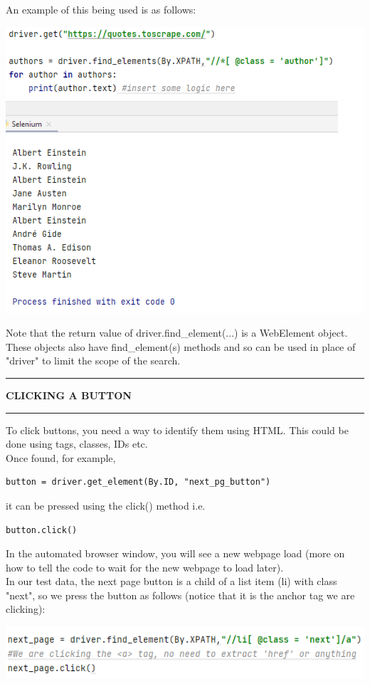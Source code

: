 \documentclass[8pt]{extarticle}
\newcommand{\heading}[1]{%
    \noindent
    \rule{\linewidth}{0.4pt}
    \begin{center}
        \vspace{-1ex}
        \textbf{#1}        
        \vspace{-2.5ex}
    \end{center}
    \rule{\linewidth}{0.4pt}
}
\begin{document}
\begin{multicols}{3}
An example of this being used is as follows:

\begin{center}
    \includegraphics[width=0.9\columnwidth]{images/finding_authors_eg.png}
\end{center}

Note that the return value of driver.find\_element(...) is a WebElement object. These objects also have find\_element(s) methods and so can be used in place of "driver" to limit the scope of the search.

\heading{CLICKING A BUTTON}

To click buttons, you need a way to identify them using HTML. This could be done using tags, classes, IDs etc. \\

Once found, for example, 
\begin{lstlisting}[style=python] 
button = driver.get_element(By.ID, "next_pg_button")
\end{lstlisting}
it can be pressed using the click() method i.e. 
\begin{lstlisting}[style=python] 
    button.click()
\end{lstlisting}
In the automated browser window, you will see a new webpage load (more on how to tell the code to wait for the new webpage to load later).\\

In our test data, the next page button is a child of a list item (li) with class "next", so we press the button as follows (notice that it is the anchor tag we are clicking):

\begin{center}
    \includegraphics[width=0.9\columnwidth]{images/clicking_button.png}
\end{center}


\end{multicols}
\end{document}
